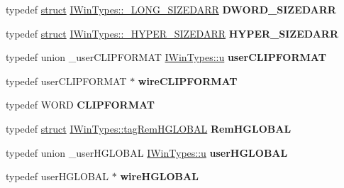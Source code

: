 \begin{DoxyCompactItemize}
typedef \hyperlink{interfacestruct}{struct} \hyperlink{struct_i_win_types_1_1___l_o_n_g___s_i_z_e_d_a_r_r}{I\+Win\+Types\+::\+\_\+\+L\+O\+N\+G\+\_\+\+S\+I\+Z\+E\+D\+A\+RR} {\bfseries D\+W\+O\+R\+D\+\_\+\+S\+I\+Z\+E\+D\+A\+RR}
\item 
\mbox{\label{interface_i_win_types_a8eb43b4d7a590dc027dd00804d6a1beb}} 
typedef \hyperlink{interfacestruct}{struct} \hyperlink{struct_i_win_types_1_1___h_y_p_e_r___s_i_z_e_d_a_r_r}{I\+Win\+Types\+::\+\_\+\+H\+Y\+P\+E\+R\+\_\+\+S\+I\+Z\+E\+D\+A\+RR} {\bfseries H\+Y\+P\+E\+R\+\_\+\+S\+I\+Z\+E\+D\+A\+RR}
\item 
\mbox{\label{interface_i_win_types_a4953e7368ed67b318c494ffd8108019c}} 
typedef union \+\_\+user\+C\+L\+I\+P\+F\+O\+R\+M\+AT \hyperlink{union_i_win_types_1_1u}{I\+Win\+Types\+::u} {\bfseries user\+C\+L\+I\+P\+F\+O\+R\+M\+AT}
\item 
\mbox{\label{interface_i_win_types_aab719b066f6e272da00c49c6eef45271}} 
typedef user\+C\+L\+I\+P\+F\+O\+R\+M\+AT $\ast$ {\bfseries wire\+C\+L\+I\+P\+F\+O\+R\+M\+AT}
\item 
\mbox{\label{interface_i_win_types_a9877be7bbcae9ac65cea905ddc6467f9}} 
typedef W\+O\+RD {\bfseries C\+L\+I\+P\+F\+O\+R\+M\+AT}
\item 
\mbox{\label{interface_i_win_types_a3ce960645c1b50c564348f9f22ab3f2b}} 
typedef \hyperlink{interfacestruct}{struct} \hyperlink{struct_i_win_types_1_1tag_rem_h_g_l_o_b_a_l}{I\+Win\+Types\+::tag\+Rem\+H\+G\+L\+O\+B\+AL} {\bfseries Rem\+H\+G\+L\+O\+B\+AL}
\item 
\mbox{\label{interface_i_win_types_a2f5137454b7c90e3be7667acb7106d05}} 
typedef union \+\_\+user\+H\+G\+L\+O\+B\+AL \hyperlink{union_i_win_types_1_1u}{I\+Win\+Types\+::u} {\bfseries user\+H\+G\+L\+O\+B\+AL}
\item 
\mbox{\label{interface_i_win_types_a19f46c7457b5d3bc1e4f1e6b9e49aeb7}} 
typedef user\+H\+G\+L\+O\+B\+AL $\ast$ {\bfseries wire\+H\+G\+L\+O\+B\+AL}
\item 
\mbox{\label{interface_i_win_types_a6dc30e8b2c2509b2137a54a9542b0e53}} 

\end{DoxyCompactItemize}
